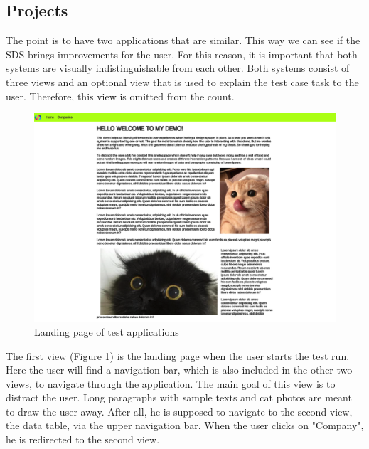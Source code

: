 \subsection{Projects}
The point is to have two applications that are similar. This way we can see if the SDS brings improvements for the user. For this reason, it is important that both systems are visually indistinguishable from each other. Both systems consist of three views and an optional view that is used to explain the test case task to the user. Therefore, this view is omitted from the count. \\

\begin{figure}[hbtp]
    \centerline{\includegraphics[width=\linewidth, draft=false]{images/demo_view_landing_page.png}}
    \caption{Landing page of test applications}
    \label{landing_page}
    \end{figure}
The first view (Figure \ref{landing_page}) is the landing page when the user starts the test run. Here the user will find a navigation bar, which is also included in the other two views, to navigate through the application. The main goal of this view is to distract the user. Long paragraphs with sample texts and cat photos are meant to draw the user away. After all, he is supposed to navigate to the second view, the data table, via the upper navigation bar. When the user clicks on "Company", he is redirected to the second view. 
\\

